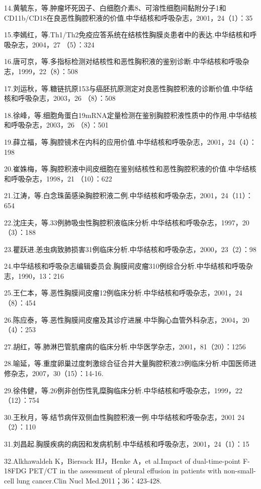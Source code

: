 14.黄毓东，等.肿瘤坏死因子、白细胞介素8、可溶性细胞间黏附分子1和CD11b/CD18在良恶性胸腔积液的价值.中华结核和呼吸杂志，2001，24（1）：35

15.李嫣红，等.Th1/Th2免疫应答系统在结核性胸膜炎患者中的表达.中华结核和呼吸杂志，2004，27
（5）：324

16.唐可京，等.多指标检测对结核性和恶性胸积液的鉴别诊断.中华结核和呼吸杂志，1999，22（8）：508

17.刘运秋，等.糖链抗原153与癌胚抗原测定对良恶性胸腔积液的诊断价值.中华结核和呼吸杂志，2003，26
（8）：508

18.徐峰，等.细胞角蛋白19mRNA定量检测在鉴别胸腔积液性质中的作用.中华结核和呼吸杂志，2003，26
（8）：501

19.薛立福，等.胸腔镜术在内科的应用价值.中华结核和呼吸杂志，2001，24（4）：198

20.崔姝梅，等.胸腔积液中间皮细胞在鉴别结核性和恶性胸腔积液的价值.中华结核和呼吸杂志，1998，21
（10）：622

21.江涛，等.白念珠菌感染胸腔积液二例.中华结核和呼吸杂志，2001，24（11）：654

22.沈庄夫，等.33例肺吸虫性胸腔积液临床分析.中华结核和呼吸杂志，1997，20（3）：188

23.瞿跃进.恙虫病致肺损害31例临床分析.中华结核和呼吸杂志，2000，23（2）：98

24.中华结核和呼吸杂志编辑委员会.胸膜间皮瘤310例综合分析.中华结核和呼吸杂志，1990，13：216

25.王仁本，等.恶性胸膜间皮瘤12例临床分析.中华结核和呼吸杂志，2001，24（8）：454

26.陈应泰，等.恶性胸膜间皮瘤及其诊疗进展.中华胸心血管外科杂志，2004，20（4）：253

27.胡红，等.肺淋巴管肌瘤病的临床分析.中华医学杂志，2001，81（20）：1256

28.喻延，等.重度卵巢过度刺激综合征合并大量胸腔积液23例临床分析.中国医师进修杂志，2007，30（15）：14-16.

29.徐伟健，等.26例非创伤性乳糜胸临床分析.中华结核和呼吸杂志，1999，22（12）：754

30.王秋月，等.结节病伴双侧血性胸腔积液一例.中华结核和呼吸杂志，2001
24（2）：110

31.刘昌起.胸膜疾病的病因和发病机制.中华结核和呼吸杂志，2001，24（1）：15

32.Alkhawaldeh K，Biersack HJ，Henke A，et al.Impact of dual-time-point
F-18FDG PET/CT in the assessment of pleural effusion in patients with
non-small-cell lung cancer.Clin Nucl Med.2011；36：423-428.

